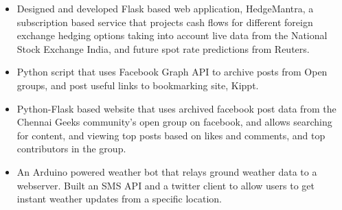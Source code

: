 \documentclass[letterpaper]{article}
\begin{document}

    \begin{itemize}
    
        \item {} \vspace{6pt} \linebreak
            \small{Designed and developed Flask based web application, HedgeMantra, a subscription based service that projects cash flows for different foreign exchange hedging options taking into account live data from the National Stock Exchange India, and future spot rate predictions from Reuters.}\normalsize\vspace{-6pt}
            
        \item {} \vspace{6pt} \linebreak
            \small{Python script that uses Facebook Graph API to archive posts from Open groups, and post useful links to bookmarking site, Kippt.}\normalsize\vspace{-6pt}
            
        \item {} \vspace{6pt} \linebreak
            \small{Python-Flask based website that uses archived facebook post data from the Chennai Geeks community's open group on facebook, and \linebreak allows searching for content, and viewing top posts based on likes and comments, and top contributors in the group.}\normalsize\vspace{-6pt}
        
        \item {} \vspace{6pt} \linebreak
            \small{An Arduino powered weather bot that relays ground weather data to a webserver. Built an SMS API and a twitter client to allow users to
            \linebreak get instant weather updates from a specific location.}\normalsize

\end{itemize}
\end{document}

